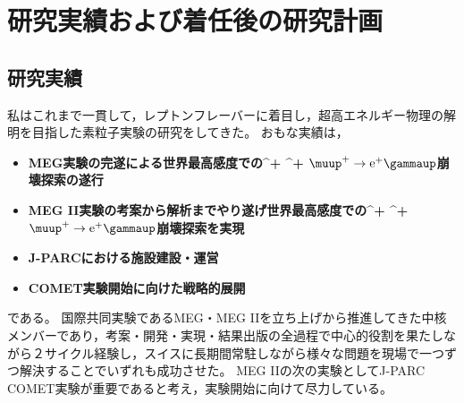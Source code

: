 \documentclass[11pt,a4paper,uplatex,dvipdfmx]{ujarticle} 		%
\newcommand{\研究課題名}{象の卵}
\newcommand{\研究機関名}{東京大学}
\newcommand{\研究代表者氏名}{内山雄祐}
\newcommand{\研究期間の最終元号年度}{6}  %
\renewcommand{\emph}[1]{{\sffamily\bfseries{#1}}}
\newcommand*{\megc}{\ifmmode\muup^+ \to \mathrm{e}^+ \gammaup\else$\muup^+ \to \mathrm{e}^+ \gammaup$\fi}
\begin{document}



%
\noindent


	
\newpage

\section{研究実績および着任後の研究計画}
\subsection{研究実績}

私はこれまで一貫して，レプトンフレーバーに着目し，超高エネルギー物理の解明を目指した素粒子実験の研究をしてきた。
おもな実績は，
\begin{itemize}
  \setlength{\parskip}{0cm} %
  \setlength{\itemsep}{0cm} %
\item	\emph{MEG実験の完遂による世界最高感度での\megc 崩壊探索の遂行}
\item	\emph{MEG II実験の考案から解析までやり遂げ世界最高感度での\megc 崩壊探索を実現}
\item       \emph{J-PARCにおける施設建設・運営}
\item       \emph{COMET実験開始に向けた戦略的展開}
\end{itemize}
である。
国際共同実験であるMEG・MEG IIを立ち上げから推進してきた中核メンバーであり，考案・開発・実現・結果出版の全過程で中心的役割を果たしながら２サイクル経験し，スイスに長期間常駐しながら様々な問題を現場で一つずつ解決することでいずれも成功させた。
MEG IIの次の実験としてJ-PARC COMET実験が重要であると考え，実験開始に向けて尽力している。

\vspace{-1zw}
\end{document}
